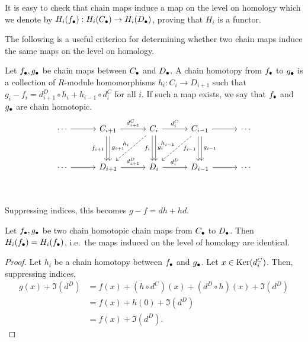 It is easy to check that chain maps induce a map on the level on homology which we denote by $H_i(f_\bullet): H_i(C_\bullet) \to  H_i(D_\bullet)$, proving that $H_i$ is a functor. 

The following is a useful criterion for determining whether two chain maps induce the same maps on the level on homology.
\begin{definition}
    Let $f_\bullet, g_\bullet$ be chain maps between  $C_\bullet$ and $D_\bullet$.
    A chain homotopy from  $f_\bullet$ to  $g_\bullet$ is a collection of  $R$-module homomorphisms $h_i: C_i \to  D_{i+1}$ such that $g_i - f_i = d^{D}_{i+1}  \circ  h_i + h_{i-1}  \circ  d_i^{C}$ for all $i$.
    If such a map exists, we say that $f_\bullet$ and  $g_\bullet$ are chain homotopic.
    \[
        \begin{tikzcd}[column sep=3em, row sep=3em]
            \cdots  \arrow[r, ""]&
            C_{i+1} \arrow[r, "d_{i+1}^{C}"] \arrow[d, "f_{i+1}"', shift right=2pt] \arrow[d, "g_{i+1}", shift left=2pt]&
            C_{i} \arrow[r, "d_{i}^{C}"] \arrow[d, "f_i"', shift right=2pt] \arrow[d, "g_{i}", shift left=2pt] \arrow[dl, "h_i"', dashed]&
            C_{i-1} \arrow[r, ""] \arrow[d, "f_{i-1}"', shift right=2pt]\arrow[d, "g_{i-1}", shift left=2pt] \arrow[dl, "h_{i-1}"', dashed]&
            \cdots \\
            \cdots  \arrow[r, ""]&
            D_{i+1} \arrow[r, "d_{i+1}^{D}"] &
            D_{i} \arrow[r, "d_{i}^{D}"] &
            D_{i-1} \arrow[r, ""] &
            \cdots \\
        \end{tikzcd}
    \]
    Suppressing indices, this becomes $g - f = dh + hd$.
\end{definition}
\begin{prop}
    Let $f_\bullet, g_\bullet$ be two chain homotopic chain maps from $C_\bullet$ to $D_\bullet$. 
    Then $H_i(f_\bullet) = H_i(f_\bullet)$, i.e.\ the maps induced on the level of homology are identical.
\end{prop}
\begin{proof}
    Let $h_i$ be a chain homotopy between  $f_\bullet$ and  $g_\bullet$.
    Let $x \in \operatorname{Ker}(d_i^{C})$.
    Then, suppressing indices,
    \begin{align*}
        g(x) + \Im(d^{D}) &= f(x) + (h  \circ  d^{C})(x) + (d^{D}  \circ h)(x)  + \Im(d^{D})\\
                          &= f(x) + h(0) + \Im(d^{D})\\
                        &= f(x) + \Im(d^{D}).
    \end{align*} 
\end{proof}

